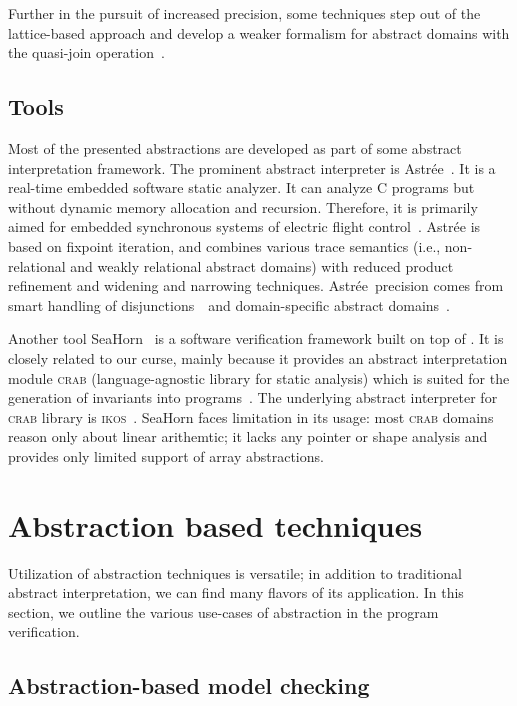 Further in the pursuit of increased precision, some techniques step out of the
lattice-based approach and develop a weaker formalism for abstract domains with
the quasi-join ope\-ra\-tion~\cite{Gange2013}.

\subsection{ Tools }

Most of the presented abstractions are developed as part of some abstract
interpretation framework. The prominent abstract interpreter is
Astrée~\cite{Astree}. It is a real-time embedded software static analyzer. It
can analyze C programs but without dynamic memory allocation and recursion.
Therefore, it is primarily aimed for embedded synchronous systems of electric
flight control~\cite{Delmas2007, Souyris2007, Bouissou2009, Bertrane2015}.
Astrée is based on fixpoint iteration, and combines various trace semantics
(i.e., non-relational and weakly relational abstract domains) with reduced
product refinement and widening and narrowing techniques. Astrée precision
comes from smart handling of disjunctions~\cite{Blanchet2003,
Mauborgne2005} and domain-specific abstract domains~\cite{Feret2004,
Feret2005}.

Another tool SeaHorn~\cite{Gurfinkel2015} is a software verification framework
built on top of \llvm.  It is closely related to our curse, mainly because it
provides an abstract interpretation module \textsc{crab} (language-agnostic
library for static analysis) which is suited for the generation of invariants
into \llvm programs~\cite{Gershuni2019}. The underlying abstract interpreter
for \textsc{crab} library is \textsc{ikos}~\cite{Ikos}. SeaHorn faces
limitation in its usage: most \textsc{crab} domains reason only about linear
arithemtic; it lacks any pointer or shape analysis and provides only limited
support of array abstractions.

\section{Abstraction based techniques}
\label{sec:techniques}

Utilization of abstraction techniques is versatile; in addition to traditional
abstract interpretation, we can find many flavors of its application. In this
section, we outline the various use-cases of abstraction in the program
verification.

\subsection{Abstraction-based model checking}

